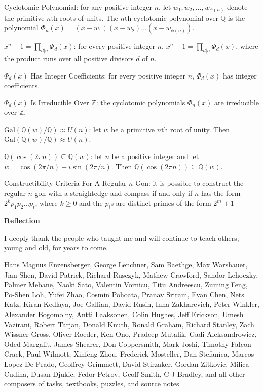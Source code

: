 Cyclotomic Polynomial: for any positive integer $n$, let $w_1,w_2,\dots,w_{\phi (n)}$ denote the primitive $n$th roots of units. The $n$th cyclotomic polynomial over $\mathbb{Q}$ is the polynomial $\Phi_n (x)=(x-w_1)(x-w_2)\dots (x-w_{\phi (n)})$.

$x^n-1=\prod_{d|n} \Phi_d (x)$: for every positive integer $n$, $x^n-1=\prod_{d|n} \Phi_d (x)$, where the product runs over all positive divisors $d$ of $n$.

$\Phi_d (x)$ Has Integer Coefficients: for every positive integer $n$, $\Phi_d (x)$ has integer coefficients.

$\Phi_d (x)$ Is Irreducible Over $\mathbb{Z}$: the cyclotomic polynomials $\Phi_n (x)$ are irreducible over $\mathbb{Z}$.

$\text{Gal}(\mathbb{Q}(w)/\mathbb{Q}) \approx U(n)$: let $w$ be a primitive $n$th root of unity. Then $\text{Gal}(\mathbb{Q}(w)/\mathbb{Q}) \approx U(n)$.

$\mathbb{Q}(\cos(2 \pi n)) \subseteq \mathbb{Q}(w)$: let $n$ be a positive integer and let $w=\cos(2\pi /n) + i\sin(2\pi /n)$. Then $\mathbb{Q}(\cos(2 \pi n)) \subseteq \mathbb{Q}(w)$.

Constructibility Criteria For A Regular $n$-Gon: it is possible to construct the regular $n$-gon with a straightedge and compass if and only if $n$ has the form $2^k p_1p_2\dots p_t$, where $k \ge 0$ and the $p_i$s are distinct primes of the form $2^m+1$

\newpage

\onecolumn

\textbf{Reflection}

I deeply thank the people who taught me and will continue to teach others, young and old, for years to come.

Hans Magnus Enzensberger, George Lenchner, Sam Baethge, Max Warshauer, Jian Shen, David Patrick, Richard Rusczyk, Mathew Crawford, Sandor Lehoczky, Palmer Mebane, Naoki Sato, Valentin Vornicu, Titu Andreescu, Zuming Feng, Po-Shen Loh, Yufei Zhao, Cosmin Pohoata, Pranav Sriram, Evan Chen, Nets Katz, Kiran Kedlaya, Joe Gallian, David Rusin, Inna Zakharevich, Peter Winkler, Alexander Bogomolny, Antti Laaksonen, Colin Hughes, Jeff Erickson, Umesh Vazirani, Robert Tarjan, Donald Knuth, Ronald Graham, Richard Stanley, Zach Wissner-Gross, Oliver Roeder, Ken Ono, Pradeep Mutalik, Gadi Aleksandrowicz, Oded Margalit, James Shearer, Don Coppersmith, Mark Joshi, Timothy Falcon Crack, Paul Wilmott, Xinfeng Zhou, Frederick Mosteller, Dan Stefanica, Marcos Lopez De Prado, Geoffrey Grimmett, David Stirzaker, Gordan Zitkovic, Milica Cudina, Dusan Djukic, Fedor Petrov, Geoff Smith, C J Bradley, and all other composers of tasks, textbooks, puzzles, and source notes.


